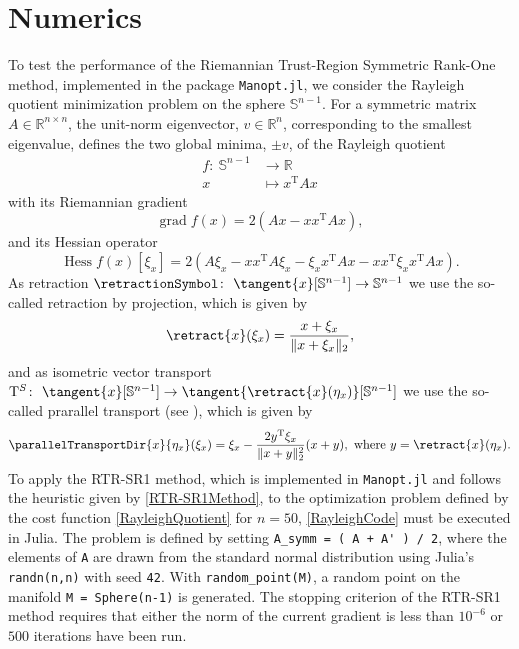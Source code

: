 \chapter{Numerics}

To test the performance of the Riemannian Trust-Region Symmetric Rank-One method, implemented in the package \lstinline!Manopt.jl!, we consider the Rayleigh quotient minimization problem on the sphere $\mathbb{S}^{n-1}$. For a symmetric matrix $A \in \mathbb{R}^{n \times n}$, the unit-norm eigenvector, $v \in \mathbb{R}^n$, corresponding to the smallest eigenvalue, defines the two global minima, $\pm v$, of the Rayleigh quotient  
\begin{equation}\label{RayleighQuotient}
    \begin{split}
        f \colon \ \mathbb{S}^{n-1} & \to \mathbb{R} \\
        x & \mapsto x^{\mathrm{T}} A x 
    \end{split}
\end{equation}   
with its Riemannian gradient 
\begin{equation*}
    \operatorname{grad} f(x) = 2(Ax - x x^{\mathrm{T}} A x),
\end{equation*}
and its Hessian operator
\begin{equation}\label{RayleighHessian}
    \operatorname{Hess} f(x) [\xi_x] = 2 (A \xi_x - x x^{\mathrm{T}} A \xi_x - \xi_x x^{\mathrm{T}} A x - x x^{\mathrm{T}} \xi_x x^{\mathrm{T}} A x).
\end{equation}
As retraction $\retractionSymbol \colon \ \tangent{x}[\mathbb{S}^{n-1}] \to \mathbb{S}^{n-1}$ we use the so-called retraction by projection, which is given by
\begin{equation*}
    \retract{x}(\xi_x) = \frac{x + \xi_x}{\lVert x + \xi_x \rVert_2},
\end{equation*}
and as isometric vector transport $\mathrm{T}^S \colon \ \tangent{x}[\mathbb{S}^{n-1}] \to \tangent{\retract{x}(\eta_x)}[\mathbb{S}^{n-1}]$ we use the so-called prarallel transport (see \cite[p.~104]{AbsilMahonySepulchre:2008}), which is given by 
\begin{equation*}
    \parallelTransportDir{x}{\eta_x}(\xi_x) = \xi_x - \frac{2 y^{\mathrm{T}} \xi_x}{\lVert x + y \rVert^{2}_2} (x + y), \text{ where } y = \retract{x}(\eta_x).
\end{equation*}
To apply the RTR-SR1 method, which is implemented in \lstinline!Manopt.jl! and follows the heuristic given by \cref{RTR-SR1Method}, to the optimization problem defined by the cost function \cref{RayleighQuotient} for $n=50$, \cref{RayleighCode} must be executed in Julia. The problem is defined by setting \lstinline!A_symm = ( A + A' ) / 2!, where the elements of \lstinline!A! are drawn from the standard normal distribution using Julia’s \lstinline!randn(n,n)! with seed \lstinline!42!. With \lstinline!random_point(M)!, a random point on the manifold \lstinline!M = Sphere(n-1)! is generated. The stopping criterion of the RTR-SR1 method requires that either the norm of the current gradient is less than $10^{-6}$ or $500$ iterations have been run. \\

